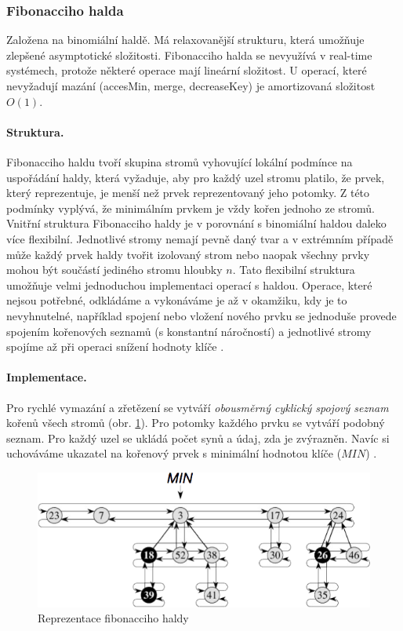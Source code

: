 \subsubsection{Fibonacciho halda}
Založena na binomiální haldě. Má relaxovanější strukturu, která umožňuje zlepšené asymptotické složitosti. Fibonacciho halda se nevyužívá v real-time systémech, protože některé operace mají lineární složitost. U operací, které nevyžadují mazání (accesMin, merge, decreaseKey) je amortizovaná složitost $O(1)$.

\paragraph{Struktura.} Fibonacciho haldu tvoří skupina stromů vyhovující lokální podmínce na uspořádání haldy, která vyžaduje, aby pro každý uzel stromu platilo, že prvek, který reprezentuje, je menší než prvek reprezentovaný jeho potomky. Z této podmínky vyplývá, že minimálním prvkem je vždy kořen jednoho ze stromů. Vnitřní struktura Fibonacciho haldy je v porovnání s binomiální haldou daleko více flexibilní. Jednotlivé stromy nemají pevně daný tvar a v extrémním případě může každý prvek haldy tvořit izolovaný strom nebo naopak všechny prvky mohou být součástí jediného stromu hloubky $n$. Tato flexibilní struktura umožňuje velmi jednoduchou implementaci operací s haldou. Operace, které nejsou potřebné, odkládáme a vykonáváme je až v okamžiku, kdy je to nevyhnutelné, například spojení nebo vložení nového prvku se jednoduše provede spojením kořenových seznamů (s konstantní náročností) a jednotlivé stromy spojíme až při operaci snížení hodnoty klíče \cite{wiki:fibonacci}.

\paragraph{Implementace.} Pro rychlé vymazání a zřetězení se vytváří \textit{obousměrný cyklický spojový seznam} kořenů všech stromů (obr. \ref{fig:fibonacci_heap}). Pro potomky každého prvku se vytváří podobný seznam. Pro každý uzel se ukládá počet synů a údaj, zda je zvýrazněn. Navíc si uchováváme ukazatel na kořenový prvek s minimální hodnotou klíče ($MIN$) \cite{wiki:fibonacci}.

\begin{figure}[htbp]
    \begin{center}
        \includegraphics[width=140mm]{01/images/fibonacci_heap}
        \caption{Reprezentace fibonacciho haldy}
        \label{fig:fibonacci_heap}
    \end{center}
\end{figure}

